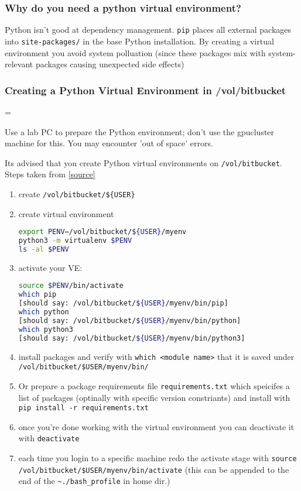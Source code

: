 \documentclass[11pt]{article}
\newenvironment{warning}
  {\par\begin{mdframed}[linewidth=1pt,linecolor=black]%
    \begin{list}{}{\leftmargin=1cm
                   \labelwidth=\leftmargin}\item[\Large\ding{43}]}
  {\end{list}\end{mdframed}\par}
\begin{document}
\subsubsection*{Why do you need a python virtual environment?}

Python isn't good at dependency management. \texttt{pip} places all external packages into \texttt{site-packages/} in the base Python installation. By creating a virtual environment you avoid system polluation (since these packages mix with system-relevant packages causing unexpected side effects)

\subsubsection*{Creating a Python Virtual Environment in /vol/bitbucket}

\begin{warning}
    Use a lab PC to prepare the Python environment; don't use the gpucluster machine for this. You may encounter 'out of space' errors.
\end{warning}

Its advised that you create Python virtual environments on \texttt{/vol/bitbucket}. Steps taken from \href{https://www.imperial.ac.uk/computing/people/csg/guides/python/virtual-environment/#d.en.1235829}{[source]}
\begin{enumerate}
    \item create \verb|/vol/bitbucket/${USER}|
    \item create virtual environment
          \begin{lstlisting}[language=sh]
export PENV=/vol/bitbucket/${USER}/myenv
python3 -m virtualenv $PENV
ls -al $PENV
          \end{lstlisting}
    \item activate your VE:
          \begin{lstlisting}[language=sh]
source $PENV/bin/activate
which pip
[should say: /vol/bitbucket/${USER}/myenv/bin/pip]
which python
[should say: /vol/bitbucket/${USER}/myenv/bin/python]
which python3
[should say: /vol/bitbucket/${USER}/myenv/bin/python3]
          \end{lstlisting}
    \item install packages and verify with \texttt{which <module name>} that it is saved under \texttt{/vol/bitbucket/\${USER}/myenv/bin/}
    \item Or prepare a package requirements file \texttt{requirements.txt} which speicifes a list of packages (optinally with specific version constriants) and install with \texttt{pip install -r requirements.txt}
    \item once you're done working with the virtual environment you can deactivate it with \texttt{deactivate}
    \item each time you login to a specific machine redo the activate stage with \texttt{source /vol/bitbucket/\${USER}/myenv/bin/activate} (this can be appended to the end of the \verb|~./bash_profile| in home dir.)
\end{enumerate}
\end{document}
